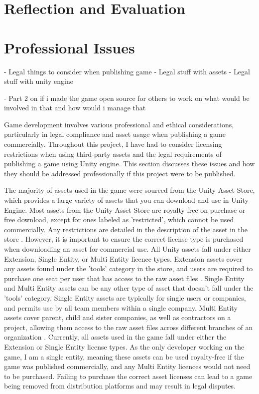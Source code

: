 \documentclass[]{final_report}
\begin{document}
\chapter{Reflection and Evaluation}\label{reflection}

\chapter{Professional Issues}

- Legal things to consider when publishing game
- Legal stuff with assets
- Legal stuff with unity engine

- Part 2 on if i made the game open source for others to work on what would be involved in that and how would i manage that

\color{red} Game development involves various professional and ethical considerations, particularly in legal compliance and asset usage when publishing a game commercially. Throughout this project, I have had to consider licensing restrictions when using third-party assets and the legal requirements of publishing a game using Unity engine. This section discusses these issues and how they should be addressed professionally if this project were to be published. \newline

The majority of assets used in the game were sourced from the Unity Asset Store, which provides a large variety of assets that you can download and use in Unity Engine. Most assets from the Unity Asset Store are royalty-free on purchase or free download, except for ones labeled as 'restricted', which cannot be used commercially. Any restrictions are detailed in the description of the asset in the store \cite{UnityCommercial}. However, it is important to ensure the correct license type is purchased when downloading an asset for commercial use.
All Unity assets fall under either Extension, Single Entity, or Multi Entity licence types. Extension assets cover any assets found under the 'tools' category in the store, and users are required to purchase one seat per user that has access to the raw asset files \cite{UnityLicences}. Single Entity and Multi Entity assets can be any other type of asset that doesn't fall under the 'tools' category. Single Entity assets are typically for single users or companies, and permits use by all team members within a single company. Multi Entity assets cover parent, child and sister companies, as well as contractors on a project, allowing them access to the raw asset files across different branches of an organization \cite{UnityLicences}. Currently, all assets used in the game fall under either the Extension or Single Entity license types. As the only developer working on the game, I am a single entity, meaning these assets can be used royalty-free if the game was published commercially, and any Multi Entity licences would not need to be purchased. Failing to purchase the correct asset licenses can lead to a game being removed from distribution platforms and may result in legal disputes.
\end{document}
